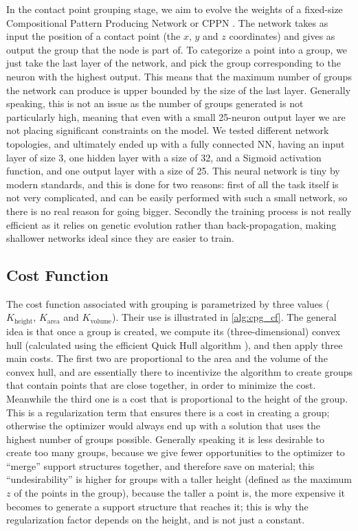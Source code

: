 In the contact point grouping stage, we aim to evolve the weights of a fixed-size Compositional Pattern Producing Network or CPPN \cite{cppn}. The network takes as input the position of a contact point (the $x$, $y$ and $z$ coordinates)
and gives as output the group that the node is part of.
To categorize a point into a group, we just take the last layer of the network, and pick the group
corresponding to the neuron with the highest output. This means that the maximum number of groups
the network can produce is upper bounded by the size of the last layer. Generally speaking, this is not an
issue as the number of groups generated is not particularly high, meaning that even with a small
25-neuron output layer we are not placing significant constraints on the model.
We tested different network topologies, and ultimately ended up with a fully connected NN, having an input layer
of size 3, one hidden layer with a size of 32, and a Sigmoid activation function, and one
output layer with a size of 25.
This neural network is tiny by modern standards, and this is done for two reasons: first of all
the task itself is not very complicated, and can be easily performed with such a small network, so
there is no real reason for going bigger. Secondly the training process is not really efficient as
it relies on genetic evolution rather than back-propagation, making shallower networks ideal since they
are easier to train.

\subsection{Cost Function}
\label{sec:contact_points_grouping_cf}

The cost function associated with grouping is parametrized by three values
($K_{\text{height}}$, $K_{\text{area}}$ and $K_{\text{volume}}$).
Their use is illustrated in \cref{alg:cpg_cf}.
The general idea is that once a group is created, we compute its (three-dimensional) convex hull
(calculated using the efficient Quick Hull algorithm \cite{quickhull}),
and then apply three main costs.
The first two are proportional to the area and the volume of the convex hull, and are
essentially there to incentivize the algorithm to create groups that contain points
that are close together, in order to minimize the cost. Meanwhile the third one is
a cost that is proportional to the height of the group. This is a regularization term
that ensures there is a cost in creating a group; otherwise the optimizer would always end up
with a solution that uses the highest number of groups possible.
Generally speaking it is less desirable to create too many groups, because we give fewer
opportunities to the optimizer to ``merge'' support structures together, and therefore
save on material; this ``undesirability'' is higher for groups with a taller height (defined
as the maximum $z$ of the points in the group), because the taller a point is, the more expensive
it becomes to generate a support structure that reaches it; this is why the regularization factor
depends on the height, and is not just a constant.

